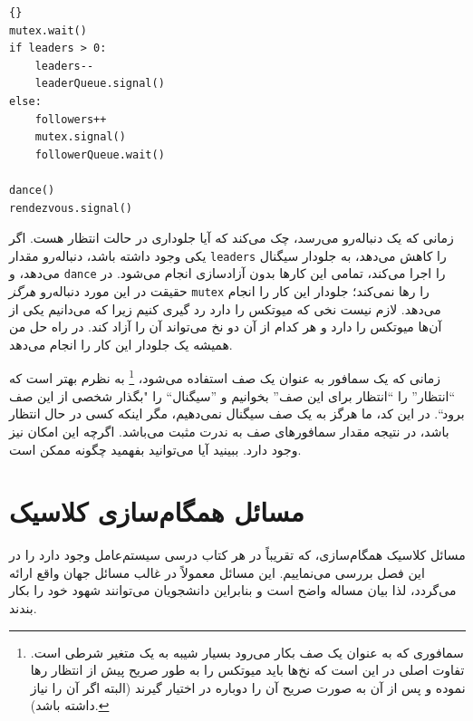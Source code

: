 \documentclass{book}
\newcommand{\clearemptydoublepage}{\newpage\cleardoublepage}
\begin{document}
\begin{latin}
\begin{latin}
\begin{lstlisting}[title=\rl{راه حل صف (دنباله‌روها)}]{}
mutex.wait()
if leaders > 0:
    leaders--
    leaderQueue.signal()
else:
    followers++
    mutex.signal()
    followerQueue.wait()    

dance()
rendezvous.signal()
\end{lstlisting}
\end{latin}
\end{latin}
    زمانی که یک دنباله‌رو می‌رسد، چک می‌کند که آیا جلو‌داری در حالت انتظار هست. 
    اگر یکی وجود داشته باشد، دنباله‌رو مقدار {\tt leaders} را کاهش می‌دهد، به جلودار سیگنال می‌دهد، و {\tt dance} را اجرا می‌کند، 
    تمامی این‌ کارها بدون آزادسازی  انجام می‌شود. 
    در حقیقت در این مورد دنباله‌رو {\em هرگز} {\tt mutex} را رها نمی‌کند؛‌ جلودار این کار را انجام می‌دهد. 
    لازم نیست نخی که میوتکس را دارد رد گیری کنیم زیرا که می‌دانیم یکی از آن‌ها میوتکس را دارد و هر کدام از آن دو نخ می‌تواند آن را آزاد کند. 
    در راه حل من همیشه یک جلودار این کار را انجام می‌دهد. 
    
    زمانی که یک سمافور به عنوان یک صف استفاده می‌شود، 
\footnote{
    سمافوری که به عنوان یک صف بکار می‌رود بسیار شیبه به یک متغیر شرطی است. تفاوت اصلی در این است که نخ‌ها باید میوتکس را به طور صریح 
    پیش از انتظار رها نموده و پس از آن به صورت صریح آن را دوباره در اختیار گیرند (البته اگر آن را نیاز داشته باشد). }
    به نظرم بهتر است که ``انتظار'' را ``انتظار برای این صف'' بخوانیم و ''سیگنال`` را  "بگذار شخصی از این صف برود``.
    در این کد، ما هرگز به یک صف سیگنال نمی‌دهیم، مگر اینکه کسی در حال انتظار باشد، 
    در نتیجه مقدار سمافور‌های صف به ندرت مثبت می‌باشد. اگرچه این امکان نیز وجود دارد. 
    ببینید آیا می‌توانید بفهمید چگونه ممکن است.


\clearemptydoublepage
\chapter{مسائل همگام‌سازی کلاسیک}


    مسائل کلاسیک همگام‌سازی، که تقریباً در هر کتاب درسی سیستم‌عامل وجود دارد را در این فصل بررسی می‌نماییم. 
    این مسائل معمولاً در غالب مسائل جهان واقع ارائه می‌گردد، لذا بیان مساله واضح است و بنابراین دانشجویان می‌توانند شهود خود را بکار بندند. 
    
\end{document}
